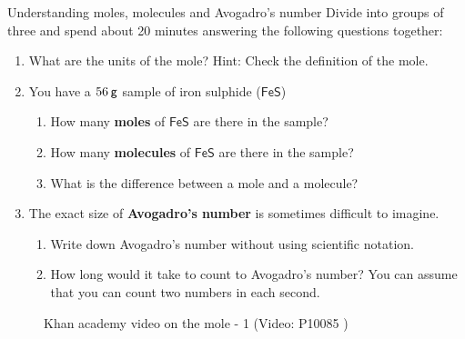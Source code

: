     \noindent
\label{m38717*secfhsst!!!underscore!!!id832}
            \begin{groupdiscussion}{Understanding moles, molecules and Avogadro's number
      }
            \nopagebreak
      \label{m38717*id279596}Divide into groups of three and spend about 20 minutes answering the following questions together:\par 
      \label{m38717*id279603}\begin{enumerate}[noitemsep, label=\textbf{\arabic*}. ] 
            \label{m38717*uid39}\item What are the units of the mole? Hint: Check the definition of the mole.
\label{m38717*uid40}\item You have a $56\phantom{\rule{2pt}{0ex}}\mathsf{g}$ sample of iron sulphide ($\mathsf{FeS}$)
\label{m38717*id279631}\begin{enumerate}[noitemsep, label=\textbf{\alph*}. ] 
            \label{m38717*uid41}\item How many \textbf{moles} of $\mathsf{FeS}$ are there in the sample?
\label{m38717*uid42}\item How many \textbf{molecules} of $\mathsf{FeS}$ are there in the sample?
\label{m38717*uid43}\item What is the difference between a mole and a molecule?
\end{enumerate}
        \label{m38717*uid44}\item The exact size of \textbf{Avogadro's number} is sometimes difficult to imagine.
\label{m38717*id279703}\begin{enumerate}[noitemsep, label=\textbf{\alph*}. ] 
            \label{m38717*uid45}\item Write down Avogadro's number without using scientific notation.
\label{m38717*uid46}\item How long would it take to count to Avogadro's number? You can assume that you can count two numbers in each second.
\end{enumerate}
        \end{enumerate}
\end{groupdiscussion}
\label{m38717*eip-945}
    \setcounter{subfigure}{0}
	\begin{figure}[H] %
    \textnormal{Khan academy video on the mole - 1}\vspace{.1in} \nopagebreak
  \label{m38717*yt-media2}\label{m38717*yt-video2}
             { (Video:  P10085 )}
      \vspace{2pt}
    \vspace{.1in}
 \end{figure}       \par \label{m38717*secfhsst!!!underscore!!!id850}
